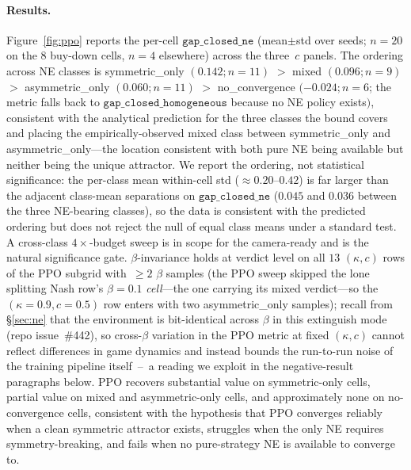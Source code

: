 \documentclass{anvil-paper}
\begin{document}
\paragraph{Results.}
Figure~\ref{fig:ppo} reports the per-cell $\texttt{gap\_closed\_ne}$
(mean$\pm$std over seeds; $n{=}20$ on the $8$ buy-down cells, $n{=}4$
elsewhere) across the three~$c$ panels. The ordering across
NE classes is
\textsf{symmetric\_only} $(0.142;n{=}11)$ $>$
\textsf{mixed} $(0.096;n{=}9)$ $>$
\textsf{asymmetric\_only} $(0.060;n{=}11)$ $>$
\textsf{no\_convergence} $(-0.024;n{=}6$; the metric falls back to
$\texttt{gap\_closed\_homogeneous}$ because no NE policy exists$)$,
consistent with the analytical prediction for the three classes the
bound covers and placing the empirically-observed \textsf{mixed} class
between \textsf{symmetric\_only} and \textsf{asymmetric\_only}---the
location consistent with both pure NE being available but neither being
the unique attractor. We report the ordering, not statistical
significance: the per-class mean within-cell std
($\approx 0.20$--$0.42$) is far larger than the adjacent class-mean
separations on $\texttt{gap\_closed\_ne}$ ($0.045$ and $0.036$ between
the three NE-bearing classes), so the data is consistent with the
predicted ordering but does not reject the null of equal class means
under a standard test. A cross-class $4{\times}$-budget sweep is in
scope for the camera-ready and is the natural significance gate.
$\beta$-invariance holds at verdict level on all $13$ $(\kappa,c)$ rows
of the PPO subgrid with~$\geq 2$ $\beta$ samples (the PPO sweep skipped
the lone splitting Nash row's $\beta{=}0.1$ \emph{cell}---the one
carrying its \textsf{mixed} verdict---so the $(\kappa{=}0.9,
c{=}0.5)$ row enters with two \textsf{asymmetric\_only} samples);
recall from
\S\ref{sec:ne} that the environment is bit-identical across $\beta$ in
this extinguish mode (repo issue~\#442), so cross-$\beta$ variation in
the PPO metric at fixed $(\kappa,c)$ cannot reflect differences in game
dynamics and instead bounds the run-to-run noise of the training
pipeline itself~--~a reading we exploit in the negative-result
paragraphs below. PPO recovers substantial value on
symmetric-only cells, partial value on mixed and asymmetric-only cells,
and approximately none on no-convergence cells, consistent with the
hypothesis that PPO converges reliably when a clean symmetric attractor
exists, struggles when the only NE requires symmetry-breaking, and fails
when no pure-strategy NE is available to converge to.
\end{document}
